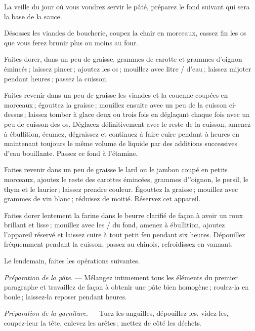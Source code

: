 \medskip

La veille du jour où vous voudrez servir le pâté, préparez le fond suivant qui
sera la base de la sauce.

Désossez les viandes de boucherie, coupez la chair en morceaux, cassez fin les
os que vous ferez brunir plus ou moins au four.

Faites dorer, dans un peu de graisse, {\mmm} grammes de carotte et
{\mmm} grammes d'oignon émincés ; laissez pincer ; ajoutez les os ;
mouillez avec {\mmm} litre {\mmm}/{\mmm} d'eau ; laissez mijoter
pendant {\mmm} heures ; passez la cuisson.

Faites revenir dans un peu de graisse les viandes et la couenne coupées en
morceaux ; égouttez la graisse ; mouillez ensuite avec un peu de la cuisson
ci-dessus ; laissez tomber à glace deux ou trois fois en déglaçant chaque fois
avec un peu de cuisson des os. Déglacez définitivement avec le reste de la
cuisson, amenez à ébullition, écumez, dégraissez et continuez à faire cuire
pendant {\mmm} à {\mmm} heures en maintenant toujours le même volume
de liquide par des additions successives d’eau bouillante. Passez ce fond
à l'étamine.

Faites revenir dans un peu de graisse le lard ou le jambon coupé en petits
morceaux, ajoutez le reste des carottes émincées, {\mmm} grammes
d'’oignon, le persil, le thym et le laurier ; laissez prendre couleur. Égouttez
la graisse ; mouillez avec {\mmm} grammes de vin blanc ; réduisez de
moitié. Réservez cet appareil.

Faites dorer lentement la farine dans le beurre clarifié de façon à avoir un
roux brillant et lisse ; mouillez avec les {\mmm}/{\mmm} du fond,
amenez à ébullition, ajoutez l'appareil réservé et laissez cuire à tout petit
feu pendant six heures. Dépouillez fréquemment pendant la cuisson, passez au
chinois, refroidissez en vannant.

\medskip

Le lendemain, faites les opérations suivantes.

\medskip

\textit{Préparation de la pâte}. — Mélangez intimement tous les éléments du
premier paragraphe et travaillez de façon à obtenir une pâte bien homogène ;
roulez-la en boule ; laissez-la reposer pendant {\mmm} heures.

\medskip

\textit{Préparation de la garniture}. — Tuez les anguilles, dépouillez-les,
videz-les, coupez-leur la tête, enlevez les arêtes ; mettez de côté les
déchets.

